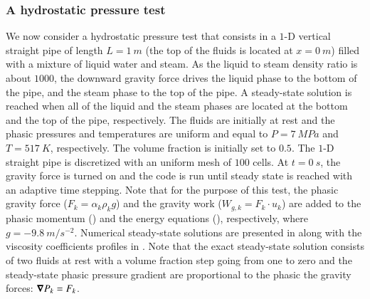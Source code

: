 \documentclass[preprint,10pt]{elsarticle}
\begin{document}
\subsubsection{A hydrostatic pressure test}\label{sec:}
%
We now consider a hydrostatic pressure test that consists in a $1$-D vertical straight pipe of length $L=1 \ m$ (the top of the fluids is located at $x=0 \ m$) filled with a mixture of liquid water and steam. As the liquid to steam density ratio is about $1000$, the downward gravity force drives the liquid phase to the bottom of the pipe, and the steam phase to the top of the pipe. A steady-state solution is reached when all of the liquid and the steam phases are located at the bottom and the top of the pipe, respectively. The fluids are initially at rest and the phasic pressures and temperatures are uniform and equal to $P=7 \ MPa$ and $T=517 \ K$, respectively. The volume fraction is initially set to $0.5$. The $1$-D straight pipe is discretized with an uniform mesh of $100$ cells. At $t=0 \ s$, the gravity force is turned on and the code is run until steady state is reached with an adaptive time stepping. Note that for the purpose of this test, the phasic gravity force ($F_k = \alpha_k \rho_k g$) and the gravity work ($W_{g,k}=F_k \cdot u_k$) are added to the phasic momentum () and the energy equations (), respectively, where $g=-9.8 \ m / s^{-2}$. Numerical steady-state solutions are presented in  along with the viscosity coefficients profiles in . Note that the exact steady-state solution consists of two fluids at rest with a volume fraction step going from one to zero and the steady-state phasic pressure gradient are proportional to the phasic the gravity forces: $\boldsymbol\nabla P_k = F_k$. 
%
\end{document}
